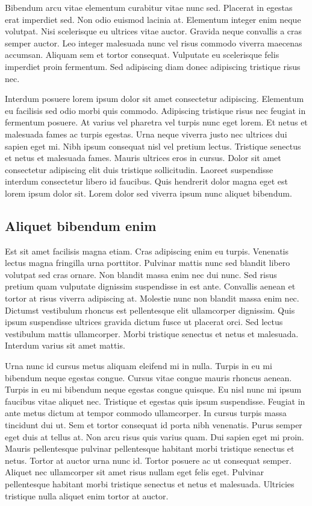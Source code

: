 \documentclass[uplatex, english, twocolumn]{jsarticle}
\begin{document}
Bibendum arcu vitae elementum curabitur vitae nunc sed. Placerat in egestas erat imperdiet sed. Non odio euismod lacinia at. Elementum integer enim neque volutpat. Nisi scelerisque eu ultrices vitae auctor. Gravida neque convallis a cras semper auctor. Leo integer malesuada nunc vel risus commodo viverra maecenas accumsan. Aliquam sem et tortor consequat. Vulputate eu scelerisque felis imperdiet proin fermentum. Sed adipiscing diam donec adipiscing tristique risus nec.

Interdum posuere lorem ipsum dolor sit amet consectetur adipiscing. Elementum eu facilisis sed odio morbi quis commodo. Adipiscing tristique risus nec feugiat in fermentum posuere. At varius vel pharetra vel turpis nunc eget lorem. Et netus et malesuada fames ac turpis egestas. Urna neque viverra justo nec ultrices dui sapien eget mi. Nibh ipsum consequat nisl vel pretium lectus. Tristique senectus et netus et malesuada fames. Mauris ultrices eros in cursus. Dolor sit amet consectetur adipiscing elit duis tristique sollicitudin. Laoreet suspendisse interdum consectetur libero id faucibus. Quis hendrerit dolor magna eget est lorem ipsum dolor sit. Lorem dolor sed viverra ipsum nunc aliquet bibendum.

\subsection{Aliquet bibendum enim}

Est sit amet facilisis magna etiam. Cras adipiscing enim eu turpis. Venenatis lectus magna fringilla urna porttitor. Pulvinar mattis nunc sed blandit libero volutpat sed cras ornare. Non blandit massa enim nec dui nunc. Sed risus pretium quam vulputate dignissim suspendisse in est ante. Convallis aenean et tortor at risus viverra adipiscing at. Molestie nunc non blandit massa enim nec. Dictumst vestibulum rhoncus est pellentesque elit ullamcorper dignissim. Quis ipsum suspendisse ultrices gravida dictum fusce ut placerat orci. Sed lectus vestibulum mattis ullamcorper. Morbi tristique senectus et netus et malesuada. Interdum varius sit amet mattis.

Urna nunc id cursus metus aliquam eleifend mi in nulla. Turpis in eu mi bibendum neque egestas congue. Cursus vitae congue mauris rhoncus aenean. Turpis in eu mi bibendum neque egestas congue quisque. Eu nisl nunc mi ipsum faucibus vitae aliquet nec. Tristique et egestas quis ipsum suspendisse. Feugiat in ante metus dictum at tempor commodo ullamcorper. In cursus turpis massa tincidunt dui ut. Sem et tortor consequat id porta nibh venenatis. Purus semper eget duis at tellus at. Non arcu risus quis varius quam. Dui sapien eget mi proin. Mauris pellentesque pulvinar pellentesque habitant morbi tristique senectus et netus. Tortor at auctor urna nunc id. Tortor posuere ac ut consequat semper. Aliquet nec ullamcorper sit amet risus nullam eget felis eget. Pulvinar pellentesque habitant morbi tristique senectus et netus et malesuada. Ultricies tristique nulla aliquet enim tortor at auctor.
\end{document}
